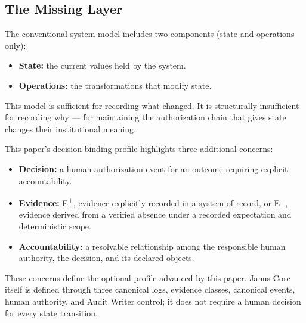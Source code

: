 \documentclass[conference]{IEEEtran}
\begin{document}
\subsection{The Missing Layer}

The conventional system model includes two components (state and operations only):

\begin{itemize}
  \item \textbf{State:} the current values held by the system.
  \item \textbf{Operations:} the transformations that modify state.
\end{itemize}

This model is sufficient for recording what changed. It is structurally insufficient for recording why --- for maintaining the authorization chain that gives state changes their institutional meaning.

This paper's decision-binding profile highlights three additional concerns:

\begin{itemize}
  \item \textbf{Decision:} a human authorization event for an outcome requiring explicit accountability.
  \item \textbf{Evidence:} E\textsuperscript{+}, evidence explicitly recorded in a system of record, or E\textsuperscript{$-$}, evidence derived from a verified absence under a recorded expectation and deterministic scope.
  \item \textbf{Accountability:} a resolvable relationship among the responsible human authority, the decision, and its declared objects.
\end{itemize}

These concerns define the optional profile advanced by this paper. Janus Core
itself is defined through three canonical logs, evidence classes, canonical
events, human authority, and Audit Writer control; it does not require a human
decision for every state transition.
\end{document}
